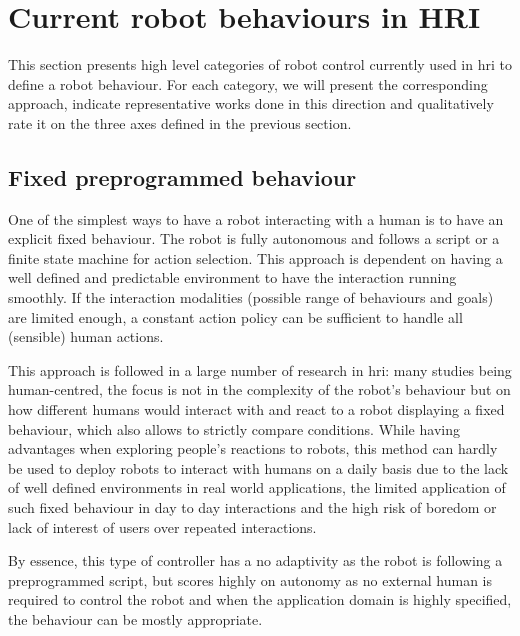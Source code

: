 \section{Current robot behaviours in HRI} \label{sec:back_behaviour}

    This section presents high level categories of robot control currently used in \gls{hri} to define a robot behaviour. 
    For each category, we will present the corresponding approach, indicate representative works done in this direction and qualitatively rate it on the three axes defined in the previous section.
	
\subsection{Fixed preprogrammed behaviour}

    One of the simplest ways to have a robot interacting with a human is to have an explicit fixed behaviour. The robot is fully autonomous and follows a script or a finite state machine for action selection. This approach is dependent on having a well defined and predictable environment to have the interaction running smoothly. If the interaction modalities (possible range of behaviours and goals) are limited enough, a constant action policy can be sufficient to handle all (sensible) human actions. 
    
    This approach is followed in a large number of research in \gls{hri}: many studies being human-centred, the focus is not in the complexity of the robot's behaviour but on how different humans would interact with and react to a robot displaying a fixed behaviour, which also allows to strictly compare conditions. While having advantages when exploring people's reactions to robots, this method can hardly be used to deploy robots to interact with humans on a daily basis due to the lack of well defined environments in real world applications, the limited application of such fixed behaviour in day to day interactions and the high risk of boredom or lack of interest of users over repeated interactions.

    By essence, this type of controller has a no adaptivity as the robot is following a preprogrammed script, but scores highly on autonomy as no external human is required to control the robot and when the application domain is highly specified, the behaviour can be mostly appropriate.

